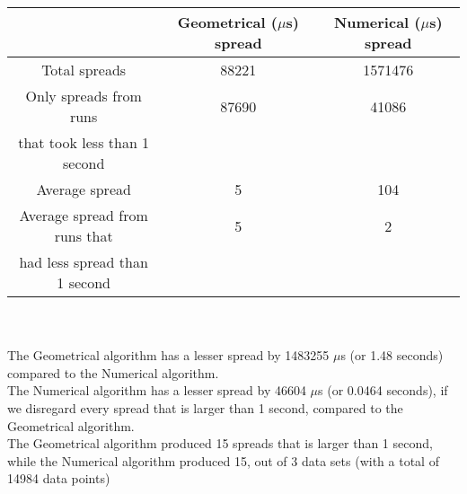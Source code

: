 \begin{tabular}[3]{c|c|c}
 & Geometrical ($\mu$s) spread & Numerical ($\mu$s) spread\\
\hline
Total spreads & 88221 & 1571476 \\ 
\hline 
Only spreads from runs & 87690 & 41086 \\ 
that took less than 1 second & & \\ 
\hline
Average spread & 5 & 104 \\
\hline
Average spread from runs that & 5 & 2 \\ 
had less spread than 1 second & & \\ 
\end{tabular}\\ \\
The Geometrical algorithm has a lesser spread by 1483255 $\mu$s (or 1.48 seconds) compared to the Numerical algorithm.\\
The Numerical algorithm has a lesser spread by 46604 $\mu$s (or 0.0464 seconds), if we disregard every spread that is larger than 1 second, compared to the Geometrical algorithm.\\
The Geometrical algorithm produced 15 spreads that is larger than 1 second, while the Numerical algorithm produced 15, out of 3 data sets (with a total of 14984 data points)\\
